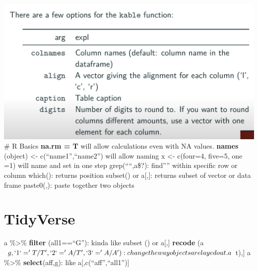 \documentclass[
]{article}
\begin{document}
\includegraphics{graphics/Screen Shot 2022-09-20 at 11.53.46 PM.png} \#
R Basics \textbf{na.rm = T} will allow calculations even with NA values.
\textbf{names} (object) \textless- c(``name1'',``name2'') will allow
naming x \textless- c(four=4, five=5, one =1) will name and set in one
step grep(````,a\$?): find'''' within specific row or column which():
returns position subset() or a{[},{]}: returns subset of vector or data
frame paste0(,): paste together two objects

\hypertarget{tidyverse}{%
\section{TidyVerse}\label{tidyverse}}

a \%\textgreater\% \textbf{filter} (all1==``G''): kinda like subset ()
or a{[},{]} \textbf{recode}
(a\(g, `1`='T/T',`2`='A/T',`3`='A/A'): change the way objects are layed out. a %
\)t),{]} a \%\textgreater\% \textbf{select}(aff,g): like
a{[},c(``aff'',``all1''){]}
\end{document}

